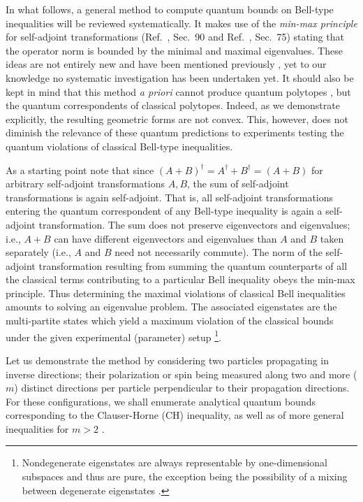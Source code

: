 \documentclass[pra,showpacs,showkeys,amsfonts,amsmath]{revtex4}
\begin{document}
In what follows,
a general method to compute quantum bounds on Bell-type inequalities
will be reviewed systematically.
It makes use of the {\em min-max principle} for self-adjoint transformations
(Ref.~\cite{halmos-vs}, Sec.~90 and  Ref.~\cite{reed-sim4}, Sec.~75)
stating that the operator norm is bounded by the minimal and maximal eigenvalues.
These ideas are not entirely new and have been mentioned previously
\cite{werner-wolf-2001,filipp-svo-04-qpoly,cabello-2003a},
yet to our knowledge no systematic investigation has been undertaken yet.
It should also be kept in mind that this method {\it a priori}
cannot produce quantum polytopes \cite{pit:range-2001,filipp-svo-04-qpoly},
but the quantum correspondents of classical polytopes.
Indeed, as we demonstrate explicitly, the resulting geometric forms are not convex.
This, however,
does not diminish the relevance of these quantum predictions
to experiments testing the quantum violations
of classical Bell-type inequalities.

As a starting point note that
since $(A+B)^\dagger =A^\dagger +B^\dagger = (A+B)$ for arbitrary self-adjoint transformations $A,B$,
the sum of self-adjoint transformations is again self-adjoint.
That is, all self-adjoint transformations entering the quantum correspondent of any Bell-type inequality
is again a self-adjoint transformation.
The sum does not preserve eigenvectors and eigenvalues;
i.e., $A+B$ can have different eigenvectors and eigenvalues than $A$ and $B$ taken separately
(i.e., $A$ and $B$ need not necessarily commute).
The norm of the self-adjoint transformation resulting from summing the quantum counterparts
of all the classical terms contributing to a particular Bell inequality obeys the min-max principle.
Thus determining the maximal violations of classical Bell inequalities amounts to
solving an eigenvalue problem.
The associated eigenstates are the multi-partite states which yield a maximum violation
of the classical bounds under the given experimental (parameter) setup
\footnote{
Nondegenerate eigenstates are always representable by one-dimensional subspaces
and thus are pure, the exception being the possibility of a mixing between
degenerate eigenstates \cite{braunstein92}.}.


Let us demonstrate the method by considering two particles propagating in inverse directions;
their polarization or spin being
measured along two and more ($m$)
distinct directions per particle
perpendicular to their propagation directions.
For these configurations, we shall enumerate analytical quantum bounds corresponding to the
Clauser-Horne (CH) inequality, as well as of more general inequalities
 for $m > 2$ \cite{2000-poly,collins-gisin-2003,sliwa-2003}.
\end{document}
